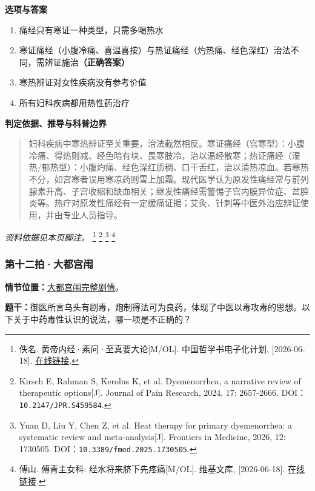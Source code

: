 \textbf{选项与答案}
\begin{enumerate}[label=\Alph*.,leftmargin=*]
  \item 痛经只有寒证一种类型，只需多喝热水
  \item 寒证痛经（小腹冷痛、喜温喜按）与热证痛经（灼热痛、经色深红）治法不同，需辨证施治\textbf{（正确答案）}
  \item 寒热辨证对女性疾病没有参考价值
  \item 所有妇科疾病都用热性药治疗
\end{enumerate}
\textbf{判定依据、推导与科普边界}
\begin{quote}妇科疾病中寒热辨证至关重要，治法截然相反。寒证痛经（宫寒型）：小腹冷痛、得热则减、经色暗有块、畏寒肢冷，治以温经散寒；热证痛经（湿热/郁热型）：小腹灼痛、经色深红质稠、口干舌红，治以清热凉血。若寒热不分，如宫寒者误用寒凉药则雪上加霜。现代医学认为原发性痛经常与前列腺素升高、子宫收缩和缺血相关；继发性痛经需警惕子宫内膜异位症、盆腔炎等。热疗对原发性痛经有一定缓痛证据；艾灸、针刺等中医外治应辨证使用，并由专业人员指导。\end{quote}
\noindent\textit{资料依据见本页脚注。}
\footnote{佚名. 黄帝内经·素问·至真要大论[M/OL]. 中国哲学书电子化计划, [2026-06-18]. \href{https://ctext.org/huangdi-neijing/zhi-zhen-yao-da-lun/zh}{在线链接}.}
\footnote{Kirsch E, Rahman S, Kerolus K, et al. Dysmenorrhea, a narrative review of therapeutic options[J]. Journal of Pain Research, 2024, 17: 2657-2666. DOI：\nolinkurl{10.2147/JPR.S459584}.}
\footnote{Yuan D, Liu Y, Chen Z, et al. Heat therapy for primary dysmenorrhea: a systematic review and meta-analysis[J]. Frontiers in Medicine, 2026, 12: 1730505. DOI：\nolinkurl{10.3389/fmed.2025.1730505}.}
\footnote{傅山. 傅青主女科: 经水将来脐下先疼痛[M/OL]. 维基文库, [2026-06-18]. \href{https://zh.wikisource.org/zh-hans/傅青主女科}{在线链接}.}

\subsubsection{第十二拍·大都宫闱}\label{question:zhaomin:12}
\textbf{情节位置：}\hyperref[plot:zhaomin:12]{大都宫闱完整剧情}。

\textbf{题干：}御医所言乌头有剧毒，炮制得法可为良药，体现了中医以毒攻毒的思想。以下关于中药毒性认识的说法，哪一项是不正确的？

